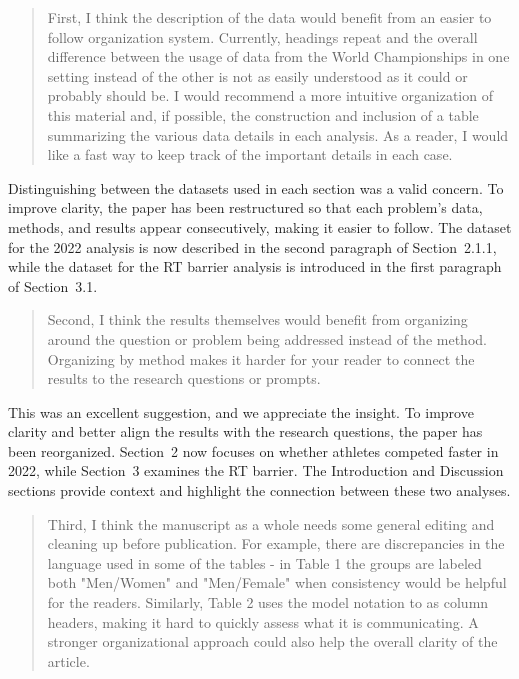 \documentclass[12pt]{article}
\newenvironment{comment}%
{\begin{quotation}\noindent\small\it\color{darkblue}\ignorespaces%
}{\end{quotation}}
\begin{document}
\begin{comment}
First, I think the description of the data would benefit from an easier to
follow organization system. Currently, headings repeat and the overall
difference between the usage of data from the World Championships in one setting
instead of the other is not as easily understood as it could or probably should
be. I would recommend a more intuitive organization of this material and, if
possible, the construction and inclusion of a table summarizing the various data
details in each analysis. As a reader, I would like a fast way to keep track of
the important details in each case.
\end{comment}

Distinguishing between the datasets used in each section was a valid
concern. To improve clarity, the paper has been restructured so that
each problem’s data, methods, and results appear consecutively, making
it easier to follow. The dataset for the 2022 analysis is now
described in the second paragraph of Section~2.1.1, while the dataset
for the RT barrier analysis is introduced in the first paragraph of
Section~3.1.


\begin{comment}
Second, I think the results themselves would benefit from organizing around the
question or problem being addressed instead of the method. Organizing by method
makes it harder for your reader to connect the results to the research questions
or prompts.
\end{comment}

This was an excellent suggestion, and we appreciate the insight. To
improve clarity and better align the results with the research
questions, the paper has been reorganized. Section~2 now focuses
on whether athletes competed faster in 2022, while Section~3
examines the RT barrier. The Introduction and Discussion
sections provide context and highlight the connection between these
two analyses.


\begin{comment}
Third, I think the manuscript as a whole needs some general editing and cleaning
up before publication. For example, there are discrepancies in the language used
in some of the tables - in Table 1 the groups are labeled both "Men/Women" and
"Men/Female" when consistency would be helpful for the readers. Similarly, Table
2 uses the model notation to as column headers, making it hard to quickly assess
what it is communicating. A stronger organizational approach could also help the
overall clarity of the article.
\end{comment}
\end{document}
